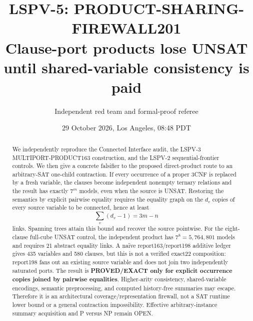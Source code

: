 \documentclass[11pt]{article}
\title{LSPV-5: PRODUCT-SHARING-FIREWALL201\\[3pt]
\large Clause-port products lose UNSAT until shared-variable consistency is paid}
\author{Independent red team and formal-proof referee}
\date{29 October 2026, Los Angeles, 08:48 PDT}
\begin{document}
\maketitle

\begin{abstract}
We independently reproduce the Connected Interface audit, the LSPV-3
MULTIPORT-PRODUCT163 construction, and the LSPV-2 sequential-frontier
controls.  We then give a concrete falsifier to the proposed direct-product
route to an arbitrary-SAT one-child contraction.  If every occurrence of a
proper 3CNF is replaced by a fresh variable, the clauses become independent
nonempty ternary relations and the result has exactly $7^m$ models, even when
the source is UNSAT.  Restoring the semantics by explicit pairwise equality
requires the equality graph on the $d_v$ copies of every source variable to
be connected, hence at least
\[
  \sum_v(d_v-1)=3m-n
\]
links.  Spanning trees attain this bound and recover the source pointwise.
For the eight-clause full-cube UNSAT control, the independent product has
$7^8=5{,}764{,}801$ models and requires 21 abstract equality links.  A naïve
report163/report198 additive ledger gives 435 variables and 580 clauses, but
this is not a verified exact22 composition: report198 fans out an existing
source variable and does not join two independently saturated ports.  The result is
\textbf{PROVED/EXACT only for explicit occurrence copies joined by pairwise
equalities}.  Higher-arity consistency, shared-variable encodings, semantic
preprocessing, and computed history-free summaries may escape.  Therefore it
is an architectural coverage/representation firewall, not a SAT runtime lower
bound or a general contraction impossibility.  Effective arbitrary-instance
summary acquisition and P versus NP remain OPEN.
\end{abstract}
\end{document}
